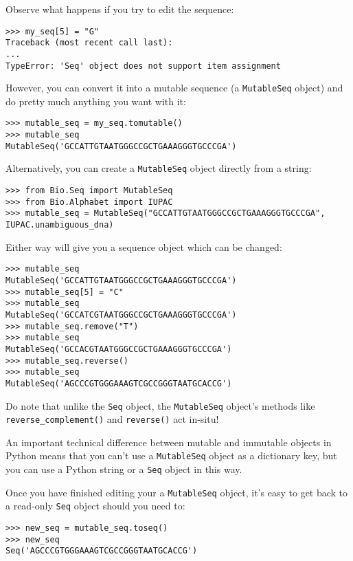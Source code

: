 Observe what happens if you try to edit the sequence:
\begin{verbatim}
>>> my_seq[5] = "G"
Traceback (most recent call last):
...
TypeError: 'Seq' object does not support item assignment
\end{verbatim}

However, you can convert it into a mutable sequence (a \verb|MutableSeq| object) and do pretty much anything you want with it:

\begin{verbatim}
>>> mutable_seq = my_seq.tomutable()
>>> mutable_seq
MutableSeq('GCCATTGTAATGGGCCGCTGAAAGGGTGCCCGA')
\end{verbatim}

Alternatively, you can create a \verb|MutableSeq| object directly from a string:

\begin{verbatim}
>>> from Bio.Seq import MutableSeq
>>> from Bio.Alphabet import IUPAC
>>> mutable_seq = MutableSeq("GCCATTGTAATGGGCCGCTGAAAGGGTGCCCGA", IUPAC.unambiguous_dna)
\end{verbatim}

Either way will give you a sequence object which can be changed:

\begin{verbatim}
>>> mutable_seq
MutableSeq('GCCATTGTAATGGGCCGCTGAAAGGGTGCCCGA')
>>> mutable_seq[5] = "C"
>>> mutable_seq
MutableSeq('GCCATCGTAATGGGCCGCTGAAAGGGTGCCCGA')
>>> mutable_seq.remove("T")
>>> mutable_seq
MutableSeq('GCCACGTAATGGGCCGCTGAAAGGGTGCCCGA')
>>> mutable_seq.reverse()
>>> mutable_seq
MutableSeq('AGCCCGTGGGAAAGTCGCCGGGTAATGCACCG')
\end{verbatim}

Do note that unlike the \verb|Seq| object, the \verb|MutableSeq| object's methods like \verb|reverse_complement()| and \verb|reverse()| act in-situ!

An important technical difference between mutable and immutable objects in Python means that you can't use a \verb|MutableSeq| object as a dictionary key, but you can use a Python string or a \verb|Seq| object in this way.

Once you have finished editing your a \verb|MutableSeq| object, it's easy to get back to a read-only \verb|Seq| object should you need to:

\begin{verbatim}
>>> new_seq = mutable_seq.toseq()
>>> new_seq
Seq('AGCCCGTGGGAAAGTCGCCGGGTAATGCACCG')
\end{verbatim}

